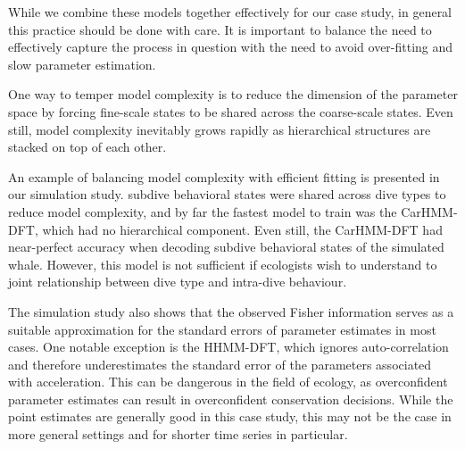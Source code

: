While we combine these models together effectively for our case study, in general this practice should be done with care. It is important to balance the need to effectively capture the process in question with the need to avoid over-fitting and slow parameter estimation.

One way to temper model complexity is to reduce the dimension of the parameter space by forcing fine-scale states to be shared across the coarse-scale states. Even still, model complexity inevitably grows rapidly as hierarchical structures are stacked on top of each other.

An example of balancing model complexity with efficient fitting is presented in our simulation study. subdive behavioral states were shared across dive types to reduce model complexity, and by far the fastest model to train was the CarHMM-DFT, which had no hierarchical component. Even still, the CarHMM-DFT had near-perfect accuracy when decoding subdive behavioral states of the simulated whale.
However, this model is not sufficient if ecologists wish to understand to joint relationship between dive type and intra-dive behaviour. 

The simulation study also shows that the observed Fisher information serves as a suitable approximation for the standard errors of parameter estimates in most cases. One notable exception is the HHMM-DFT, which ignores auto-correlation and therefore underestimates the standard error of the parameters associated with acceleration. This can be dangerous in the field of ecology, as overconfident parameter estimates can result in overconfident conservation decisions. While the point estimates are generally good in this case study, this may not be the case in more general settings and for shorter time series in particular.


